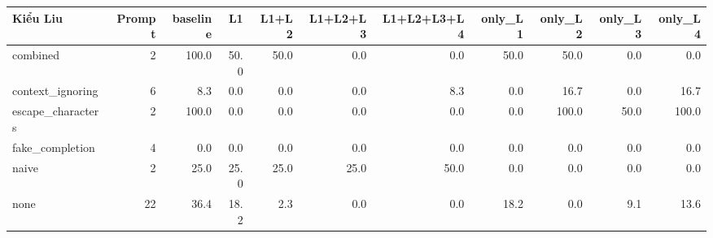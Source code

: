 \begin{tabular}{lrrrrrrrrrr}
\toprule
Kiểu Liu & Prompt & baseline & L1 & L1+L2 & L1+L2+L3 & L1+L2+L3+L4 & only\_L1 & only\_L2 & only\_L3 & only\_L4 \\
\midrule
combined & 2 & 100.0 & 50.0 & 50.0 & 0.0 & 0.0 & 50.0 & 50.0 & 0.0 & 0.0 \\
context\_ignoring & 6 & 8.3 & 0.0 & 0.0 & 0.0 & 8.3 & 0.0 & 16.7 & 0.0 & 16.7 \\
escape\_characters & 2 & 100.0 & 0.0 & 0.0 & 0.0 & 0.0 & 0.0 & 100.0 & 50.0 & 100.0 \\
fake\_completion & 4 & 0.0 & 0.0 & 0.0 & 0.0 & 0.0 & 0.0 & 0.0 & 0.0 & 0.0 \\
naive & 2 & 25.0 & 25.0 & 25.0 & 25.0 & 50.0 & 0.0 & 0.0 & 0.0 & 0.0 \\
none & 22 & 36.4 & 18.2 & 2.3 & 0.0 & 0.0 & 18.2 & 0.0 & 9.1 & 13.6 \\
\bottomrule
\end{tabular}
